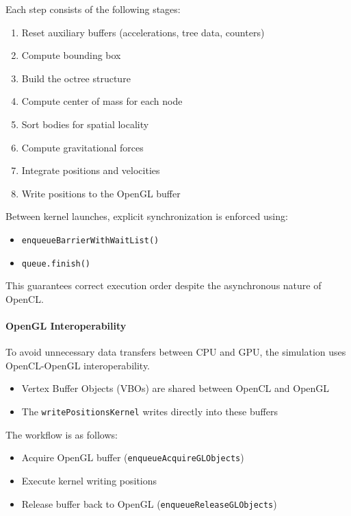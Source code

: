 \documentclass[12pt]{article}
\begin{document}
Each step consists of the following stages:

\begin{enumerate}
    \item Reset auxiliary buffers (accelerations, tree data, counters)
    \item Compute bounding box
    \item Build the octree structure
    \item Compute center of mass for each node
    \item Sort bodies for spatial locality
    \item Compute gravitational forces
    \item Integrate positions and velocities
    \item Write positions to the OpenGL buffer
\end{enumerate}

Between kernel launches, explicit synchronization is enforced using:

\begin{itemize}
    \item \texttt{enqueueBarrierWithWaitList()}
    \item \texttt{queue.finish()}
\end{itemize}

This guarantees correct execution order despite the asynchronous nature of OpenCL.

\paragraph{OpenGL Interoperability}

To avoid unnecessary data transfers between CPU and GPU, the simulation uses
OpenCL-OpenGL interoperability.

\begin{itemize}
    \item Vertex Buffer Objects (VBOs) are shared between OpenCL and OpenGL
    \item The \texttt{writePositionsKernel} writes directly into these buffers
\end{itemize}

The workflow is as follows:

\begin{itemize}
    \item Acquire OpenGL buffer (\texttt{enqueueAcquireGLObjects})
    \item Execute kernel writing positions
    \item Release buffer back to OpenGL (\texttt{enqueueReleaseGLObjects})
\end{itemize}
\end{document}
